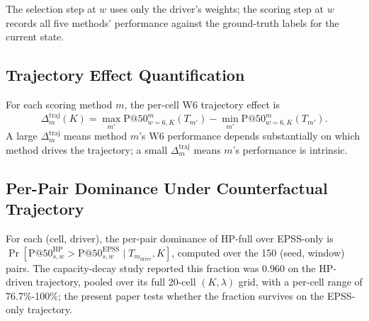 The selection step at $w$ uses only the driver's weights; the scoring
step at $w$ records all five methods' performance against the
ground-truth labels for the current state.

\subsection{Trajectory Effect Quantification}

For each scoring method $m$, the per-cell W6 trajectory effect is
\begin{equation}
\Delta^{\mathrm{traj}}_m(K) = \max_{m'} \mathrm{P@50}^m_{w=6, K}(T_{m'})
 - \min_{m'} \mathrm{P@50}^m_{w=6, K}(T_{m'}).
\end{equation}
A large $\Delta^{\mathrm{traj}}_m$ means method $m$'s W6 performance
depends substantially on which method drives the trajectory; a small
$\Delta^{\mathrm{traj}}_m$ means $m$'s performance is intrinsic.

\subsection{Per-Pair Dominance Under Counterfactual Trajectory}

For each (cell, driver), the per-pair dominance of HP-full over EPSS-only
is
$\Pr[\mathrm{P@50}^{\mathrm{HP}}_{s, w} > \mathrm{P@50}^{\mathrm{EPSS}}_{s, w} \mid
T_{m_{\mathrm{drive}}}, K]$,
computed over the 150 (seed, window) pairs. The capacity-decay study reported this
fraction was 0.960 on the HP-driven trajectory, pooled over its full
20-cell $(K, \lambda)$ grid, with a per-cell range of
76.7\%-100\%; the present paper tests whether the fraction survives
on the EPSS-only trajectory.
